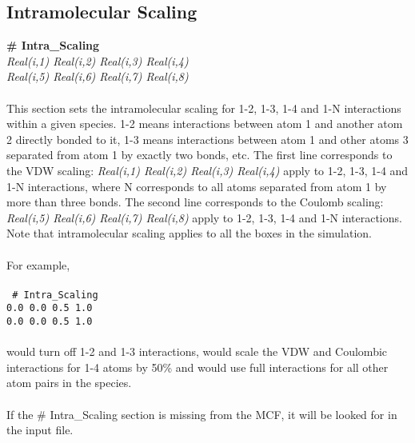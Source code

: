 \subsection{Intramolecular Scaling}\label{sec:Intra_Scaling}
{\bf \# Intra\_Scaling} \\
{\it Real(i,1) Real(i,2) Real(i,3) Real(i,4)} \\ 
{\it Real(i,5) Real(i,6) Real(i,7) Real(i,8)} \\ \\
%
This section sets the intramolecular scaling for 1-2, 1-3, 1-4 and 1-N
interactions within a given species. 1-2 means interactions between 
atom 1 and another atom 2 directly bonded to it, 1-3 means
interactions between atom 1 and other atoms 3 separated from atom 1 by
exactly two bonds, etc. The first line corresponds to the
VDW scaling: {\it Real(i,1) Real(i,2) Real(i,3) Real(i,4)} apply to
1-2, 1-3, 1-4 and 1-N interactions, where N corresponds to all atoms
separated from atom 1 by more than three bonds. 
The second line corresponds to the Coulomb scaling: 
{\it Real(i,5)  Real(i,6) Real(i,7) Real(i,8)} apply to 1-2, 1-3, 1-4 and 1-N interactions. 
Note that intramolecular scaling applies to all the boxes in the simulation. \\ \\
%
For example, \\ \\
\texttt{
\# Intra\_Scaling \\
0.0 0.0 0.5 1.0 \\
0.0 0.0 0.5 1.0}
\\ \\
would turn off 1-2 and 1-3 interactions, would scale the VDW and
Coulombic interactions for 1-4 atoms by 50\% and would use full
interactions for all other atom pairs in the species. \\ \\
%
If the \# Intra\_Scaling section is missing from the MCF, 
it will be looked for in the input file. \\ \\
%

